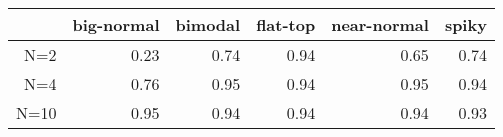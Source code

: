 \begin{tabular}{rrrrrr}
  \toprule  & big-normal & bimodal & flat-top & near-normal & spiky \\ 
  \midrule N=2 & 0.23 & 0.74 & 0.94 & 0.65 & 0.74 \\ 
  N=4 & 0.76 & 0.95 & 0.94 & 0.95 & 0.94 \\ 
  N=10 & 0.95 & 0.94 & 0.94 & 0.94 & 0.93 \\ 
   \bottomrule \end{tabular}


